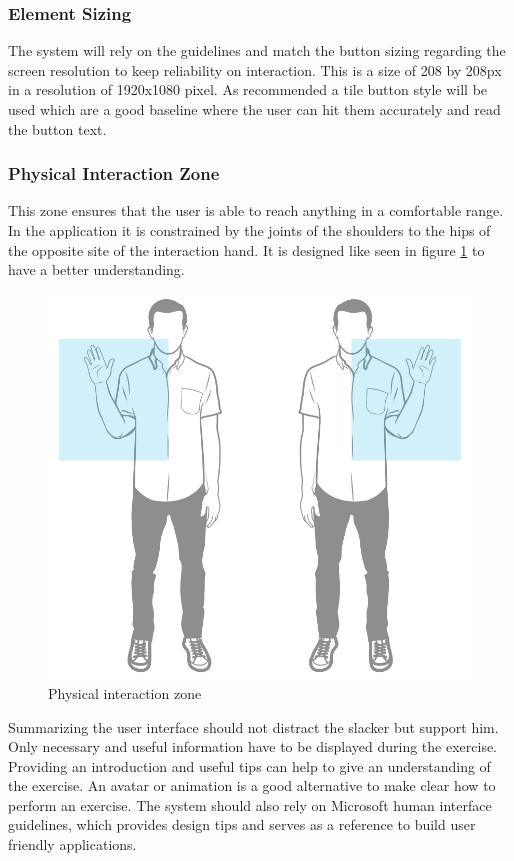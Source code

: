 \subsubsection{Element Sizing}
The system will rely on the guidelines and match the button sizing regarding the screen resolution to keep reliability on interaction. This is a size of 208 by 208px in a resolution of 1920x1080 pixel. As recommended a tile button style will be used which are a good baseline where the user can hit them accurately and read the button text.

\subsubsection{Physical Interaction Zone}
This zone ensures that the user is able to reach anything in a comfortable range. In the application it is constrained by the joints of the shoulders to the hips of the opposite site of the interaction hand. It is designed like seen in figure \ref{fig:higPHIZ} to have a better understanding.
\begin{figure}[htb]
	\centering
	\begin{minipage}[t]{1\linewidth}
		\centering
		\includegraphics[width=0.32\linewidth]{Pictures/higPHIZ}
		\caption{Physical interaction zone~\cite{MicrosoftHIG2014-mh}}
		\label{fig:higPHIZ}
	\end{minipage}
\end{figure}

Summarizing the user interface should not distract the slacker but support him. Only necessary and useful information have to be displayed during the exercise. Providing an introduction and useful tips can help to give an understanding of the exercise. An avatar or animation is a good alternative to make clear how to perform an exercise. The system should also rely on Microsoft human interface guidelines, which provides design tips and serves as a reference to build user friendly applications.
